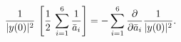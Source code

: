 \begin{equation}
{1\over |y(0)|^2}\, \left[ {1\over 2} \, \sum_{i=1}^6{1\over\bar
a_i} \right]  =-\sum_{i=1}^6 {\partial \over \partial \bar
a_i}{1\over |y(0)|^2}.
\end{equation}

